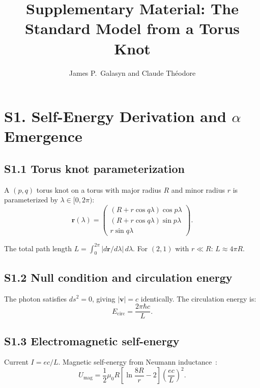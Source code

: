 \documentclass[11pt,a4paper]{article}
\title{\textbf{Supplementary Material: The Standard Model from a Torus Knot}}
\author{James P.\ Galasyn and Claude Th\'eodore}
\date{}
\begin{document}
\maketitle

\section{S1. Self-Energy Derivation and \texorpdfstring{$\alpha$}{alpha} Emergence}
\label{sec:S1}

\subsection{S1.1 Torus knot parameterization}

A $(p,q)$ torus knot on a torus with major radius $R$ and minor radius $r$ is parameterized by $\lambda \in [0, 2\pi)$:
\begin{equation}
  \mathbf{r}(\lambda) = \begin{pmatrix} (R + r\cos q\lambda)\cos p\lambda \\ (R + r\cos q\lambda)\sin p\lambda \\ r\sin q\lambda \end{pmatrix}.
\end{equation}

The total path length $L = \int_0^{2\pi} |d\mathbf{r}/d\lambda|\,d\lambda$. For $(2,1)$ with $r \ll R$: $L \approx 4\pi R$.

\subsection{S1.2 Null condition and circulation energy}

The photon satisfies $ds^2 = 0$, giving $|\mathbf{v}| = c$ identically. The circulation energy is:
\begin{equation}
  E_{\text{circ}} = \frac{2\pi\hbar c}{L}.
\end{equation}

\subsection{S1.3 Electromagnetic self-energy}

Current $I = ec/L$. Magnetic self-energy from Neumann inductance~\cite{jackson1999}:
\begin{equation}
  U_{\text{mag}} = \frac{1}{2}\mu_0 R\left[\ln\frac{8R}{r} - 2\right]\left(\frac{ec}{L}\right)^{\!2}.
\end{equation}
\end{document}
